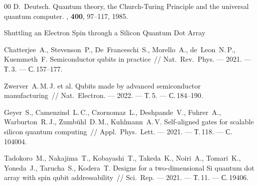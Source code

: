 \documentclass[a4paper,14pt]{extreport} %
\begin{document}
\begin{thebibliography}{00}
D.~Deutsch.
\newblock Quantum theory, the {C}hurch-{T}uring {P}rinciple and the universal
  quantum computer.
, {\bf 400}, 97--117, 1985.

Shuttling an Electron Spin through a Silicon Quantum Dot Array

Chatterjee~A., Stevenson~P., De~Franceschi~S., Morello~A., de~Leon~N.\,P.,
Kuemmeth~F.
Semiconductor qubits in practice~//
Nat.\ Rev.\ Phys. — 2021. — Т.\,3. — С.\,157--177.

Zwerver~A.\,M.\,J. et al.
Qubits made by advanced semiconductor manufacturing~//
Nat.\ Electron. — 2022. — Т.\,5. — С.\,184--190.

Geyer~S., Camenzind~L.\,C., Czornomaz~L., Deshpande~V., Fuhrer~A.,
Warburton~R.\,J., Zumbühl~D.\,M., Kuhlmann~A.\,V.
Self-aligned gates for scalable silicon quantum computing~//
Appl.\ Phys.\ Lett. — 2021. — Т.\,118. — С.\,104004.

Tadokoro~M., Nakajima~T., Kobayashi~T., Takeda~K., Noiri~A., Tomari~K.,
Yoneda~J., Tarucha~S., Kodera~T.
Designs for a two-dimensional Si quantum dot array with spin qubit
addressability~//
Sci.\ Rep. — 2021. — Т.\,11. — С.\,19406.

\end{thebibliography}
\end{document}
